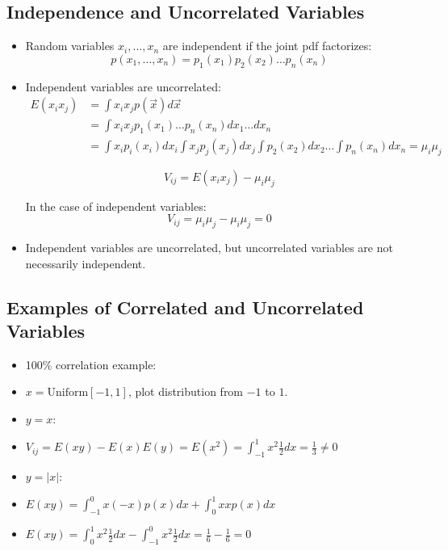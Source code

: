 \subsection{Independence and Uncorrelated Variables}
\begin{itemize}
      \item Random variables $x_i, \dots, x_n$ are independent if the joint pdf factorizes:
            \[ p(x_1, \ldots, x_n) = p_1(x_1) p_2(x_2) \ldots p_n(x_n) \]
      \item Independent variables are uncorrelated:
            \begin{align*}
                  E(x_i x_j) & = \int x_i x_j p(\vec{x}) d \vec{x}                                                                        \\
                             & = \int x_i x_j p_1(x_1) \ldots p_n(x_n) dx_1 \ldots dx_n                                                   \\
                             & = \int x_i p_i(x_i) dx_i \int x_j p_j(x_j) dx_j \int p_2(x_2) dx_2 \ldots \int p_n(x_n) dx_n = \mu_i \mu_j
            \end{align*}

            \[ V_{ij} = E(x_i x_j) - \mu_i \mu_j \]

            In the case of independent variables:
            \[ V_{ij} = \mu_i \mu_j - \mu_i \mu_j = 0 \]

      \item Independent variables are uncorrelated, but uncorrelated variables are not necessarily independent.
\end{itemize}

\subsection{Examples of Correlated and Uncorrelated Variables}
\begin{itemize}
      \item 100\% correlation example:
      \item $x = \text{Uniform}[-1, 1]$, plot distribution from $-1$ to $1$.
      \item $y = x$:
      \item $V_{ij} = E(xy) - E(x)E(y) = E(x^2) = \int_{-1}^{1} x^2 \frac{1}{2} dx = \frac{1}{3} \neq 0$
      \item $y = |x|$:
      \item $E(xy) = \int_{-1}^{0} x(-x) p(x) dx + \int_0^{1} x x p(x) dx$
      \item $E(xy) = \int_0^{1} x^2 \frac{1}{2} dx - \int_{-1}^{0} x^2 \frac{1}{2} dx = \frac{1}{6} - \frac{1}{6} = 0$
\end{itemize}

